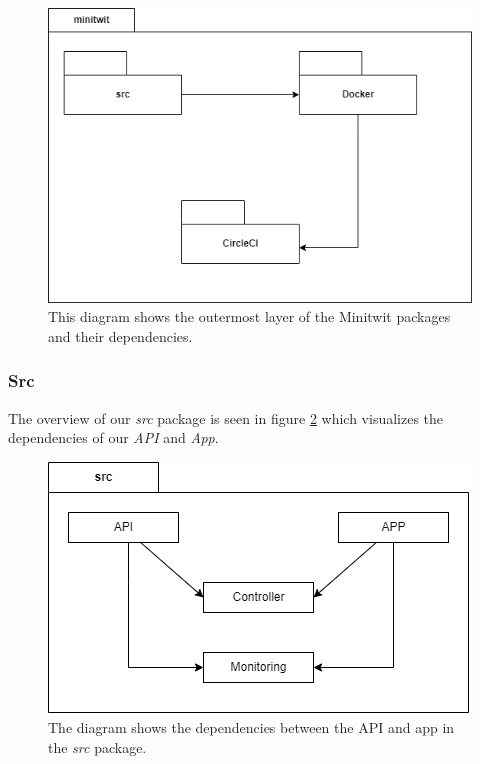 \begin{figure}[H]
    \centering
    \includegraphics[scale=0.60]{images/packages.png}
    \caption{This diagram shows the outermost layer of the Minitwit packages and their dependencies.}
    \label{fig:packages}
\end{figure}


\subsubsection*{Src}
The overview of our \textit{src} package is seen in figure \ref{fig:src} which visualizes the dependencies of our \textit{API} and \textit{App}.

\begin{figure}[H]
    \centering
    \includegraphics[scale=0.75]{images/src.png}
    \caption{The diagram shows the dependencies between the API and app in the \textit{src} package.}
    \label{fig:src}
\end{figure}

\newpage

